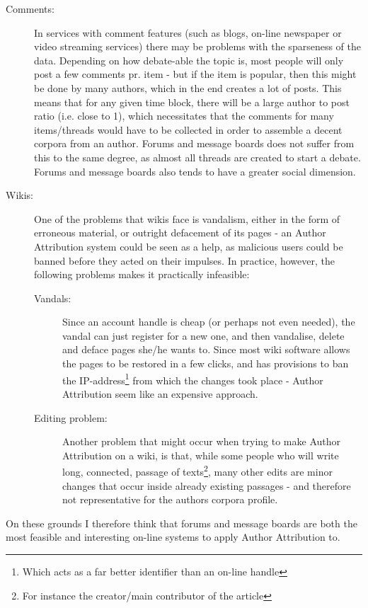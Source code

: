 \begin{description}
\item[Comments:] In services with comment features (such as blogs, on-line newspaper or video streaming services) there may be problems with the sparseness of the data. Depending on how debate-able the topic is, most people will only post a few comments pr. item - but if the item is popular, then this might be done by many authors, which in the end creates a lot of posts. This means that for any given time block, there will be a large author to post ratio (i.e. close to 1), which necessitates that the comments for many items/threads would have to be collected in order to assemble a decent corpora from an author. Forums and message boards does not suffer from this to the same degree, as almost all threads are created to start a debate. Forums and message boards also tends to have a greater social dimension.

\item[Wikis:] One of the problems that wikis face is vandalism, either in the form of erroneous material, or outright defacement of its pages - an Author Attribution system could be seen as a help, as malicious users could be banned before they acted on their impulses. In practice, however, the following problems makes it practically infeasible:
\begin{description}
\item[Vandals:] Since an account handle is cheap (or perhaps not even needed), the vandal can just register for a new one, and then vandalise, delete and deface pages she/he wants to. Since most wiki software allows the pages to be restored in a few clicks, and has provisions to ban the IP-address\footnote{Which acts as a far better identifier than an on-line handle} from which the changes took place - Author Attribution seem like an expensive approach.  

\item[Editing problem:] Another problem that might occur when trying to make Author Attribution on a wiki, is that, while some people who will write long, connected, passage of texts\footnote{For instance the creator/main contributor of the article}, many other edits are minor changes that occur inside already existing passages - and therefore not representative for the authors corpora profile.   
\end{description} 
\end{description}

On these grounds I therefore think that forums and message boards are both the most feasible and  interesting on-line systems to apply Author Attribution to.

